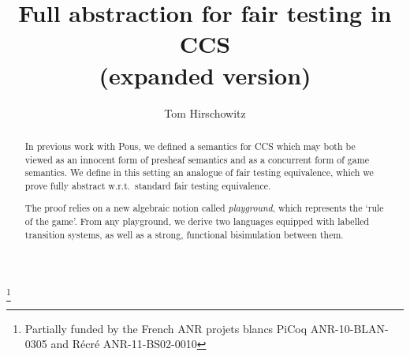 \documentclass{LMCS}
\theoremstyle{plain}\newtheorem{satz}[thm]{Satz}
\begin{document}
\author[T.~Hirschowitz]{Tom Hirschowitz}
\address{CNRS, Universit\'e de Savoie}
\thanks{Partially
    funded by the French ANR projets blancs PiCoq ANR-10-BLAN-0305 and
    R\'ecr\'e ANR-11-BS02-0010}


\title[Full abstraction for fair testing in CCS]{Full abstraction for fair testing in CCS \\ {\tiny (expanded version)}\rsuper*}








\begin{abstract}
  \noindent In previous work with Pous, we defined a semantics for CCS
  which may both be viewed as an innocent form of presheaf semantics
  and as a concurrent form of game semantics.  We define in this
  setting an analogue of fair testing equivalence, which we prove
  fully abstract w.r.t.\ standard fair testing equivalence.

  The proof relies on a new algebraic notion called \emph{playground},
  which represents the `rule of the game'. From any playground, we
  derive two languages equipped with labelled transition systems, as
  well as a strong, functional bisimulation between them.
\end{abstract}

\maketitle

\clearpage
\tableofcontents
\clearpage
\end{document}
